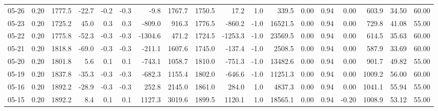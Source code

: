 \begin{threeparttable}
{\begin{tabular}{lrrrrrrrrrrrrrrrrr}
  05-26 &     0.20 & 1777.5 &             -22.7 &              -0.2 &               -0.3 &               -9.8 & 1767.7 & 1750.5 &       17.2 &                      1.0 &               339.5 &       0.00 &      0.94 &           0.00 &            603.9 &           34.50 &                  60.00 \\
  05-23 &     0.20 & 1725.2 &              45.0 &               0.3 &                0.3 &             -809.0 &  916.3 & 1776.5 &     -860.2 &                     -1.0 &             16521.5 &       0.00 &      0.94 &           0.00 &            729.8 &           41.08 &                  55.00 \\
  05-22 &     0.20 & 1775.8 &             -52.3 &              -0.3 &               -0.3 &            -1304.6 &  471.2 & 1724.5 &    -1253.3 &                     -1.0 &             23569.5 &       0.00 &      0.94 &           0.00 &            614.5 &           35.63 &                  60.00 \\
  05-21 &     0.20 & 1818.8 &             -69.0 &              -0.3 &               -0.3 &             -211.1 & 1607.6 & 1745.0 &     -137.4 &                     -1.0 &              2508.5 &       0.00 &      0.94 &           0.00 &            587.9 &           33.69 &                  60.00 \\
  05-20 &     0.20 & 1801.8 &               5.6 &               0.1 &                0.1 &             -743.1 & 1058.7 & 1810.0 &     -751.3 &                     -1.0 &             13482.6 &       0.00 &      0.94 &           0.00 &            901.7 &           49.82 &                  55.00 \\
  05-19 &     0.20 & 1837.8 &             -35.3 &              -0.3 &               -0.3 &             -682.3 & 1155.4 & 1802.0 &     -646.6 &                     -1.0 &             11251.3 &       0.00 &      0.94 &           0.00 &           1009.2 &           56.00 &                  60.00 \\
  05-16 &     0.20 & 1892.2 &             -28.9 &              -0.3 &               -0.3 &              252.8 & 2145.0 & 1861.0 &      284.0 &                      1.0 &              4837.3 &       0.00 &      0.94 &           0.00 &           1041.1 &           55.94 &                  55.00 \\
  05-15 &     0.20 & 1892.2 &               8.4 &               0.1 &                0.1 &             1127.3 & 3019.6 & 1899.5 &     1120.1 &                      1.0 &             18565.1 &       0.00 &      0.94 &          -0.20 &           1008.9 &           53.12 &                  55.00 \\

\end{tabular}}
\end{threeparttable}
